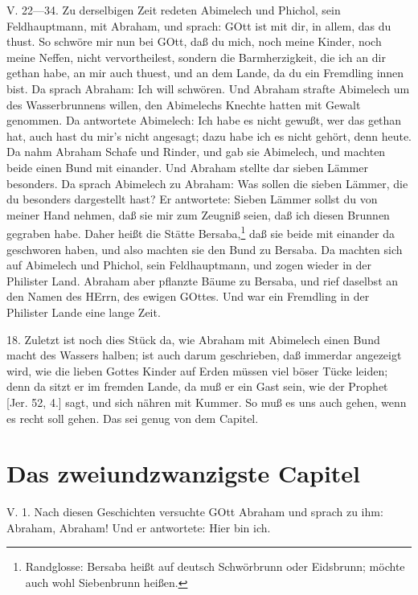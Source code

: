 \begin{schriftzitat}
V. 22—34. Zu derselbigen Zeit redeten Abimelech und Phichol, sein Feldhauptmann, mit Abraham, und sprach: GOtt ist mit dir, in allem, das du thust. So schwöre mir nun bei GOtt, daß du mich, noch meine Kinder, noch meine Neffen, nicht vervortheilest, sondern die Barmherzigkeit, die ich an dir gethan habe, an mir auch thuest, und an dem Lande, da du ein Fremdling innen bist. Da sprach Abraham: Ich will schwören. Und Abraham strafte Abimelech um des Wasserbrunnens willen, den Abimelechs Knechte hatten mit Gewalt genommen. Da antwortete Abimelech: Ich habe es nicht gewußt, wer das gethan hat, auch hast du mir’s nicht angesagt; dazu habe ich es nicht gehört, denn heute. Da nahm Abraham Schafe und Rinder, und gab sie Abimelech, und machten beide einen Bund mit einander. Und Abraham stellte dar sieben Lämmer besonders. Da sprach Abimelech zu Abraham: Was sollen die sieben Lämmer, die du besonders dargestellt hast? Er antwortete: Sieben Lämmer sollst du von meiner Hand nehmen, daß sie mir zum Zeugniß seien, daß ich diesen Brunnen gegraben habe. Daher heißt die Stätte Bersaba,\footnote{Randglosse: Bersaba heißt auf deutsch Schwörbrunn oder Eidsbrunn; möchte auch wohl Siebenbrunn heißen.} daß sie beide mit einander da geschworen haben, und also machten sie den Bund zu Bersaba. Da machten sich auf Abimelech und Phichol, sein Feldhauptmann, und zogen wieder in der Philister Land. Abraham aber pflanzte Bäume zu Bersaba, und rief daselbst an den Namen des HErrn, des ewigen GOttes. Und war ein Fremdling in der Philister Lande eine lange Zeit.
\end{schriftzitat}

18. Zuletzt ist noch dies Stück da, wie Abraham mit Abimelech einen Bund macht des Wassers halben; ist auch darum geschrieben, daß immerdar angezeigt wird, wie die lieben Gottes Kinder auf Erden müssen viel böser Tücke leiden; denn da sitzt er im fremden Lande, da muß er ein Gast sein, wie der Prophet [Jer. 52, 4.] sagt, und sich nähren mit Kummer. So muß es uns auch gehen, wenn es recht soll gehen. Das sei genug von dem Capitel.

\section{Das zweiundzwanzigste Capitel}

\begin{schriftzitat}
V. 1. Nach diesen Geschichten versuchte GOtt Abraham und sprach zu ihm: Abraham, Abraham! Und er antwortete: Hier bin ich.
\end{schriftzitat}

